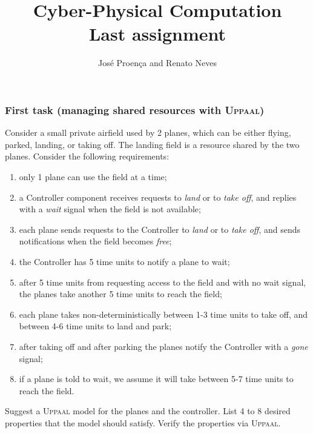\documentclass[11pt]{article}
\date{}
\theoremstyle{myplain}
\theoremstyle{definition} %
\begin{document}
 
 
\title{Cyber-Physical Computation
\\ {\small Last assignment}}
\author{José Proença and Renato Neves}
 
\maketitle

\subsubsection*{First task (managing shared resources with \textsc{Uppaal})}
Consider a small private airfield used by 2 planes, which can be either flying,
parked, landing, or taking off. The landing field is a resource shared by the
two planes. Consider the following requirements:
\begin{enumerate}
  \setlength\itemsep{0.3mm}
  \item only 1 plane can use the field at a time;
  \item a Controller component receives requests to \emph{land} or to \emph{take off}, and replies with a \emph{wait} signal when the field is not available;
  \item each plane sends requests to the Controller to \emph{land} or to \emph{take off}, and sends notifications when the field becomes \emph{free};
  \item the Controller has 5 time units to notify a plane to wait;
  \item after 5 time units from requesting access to the field and with no wait signal, the planes take another 5 time units to reach the field;
  \item each plane takes non-deterministically between 1-3 time units to take off, and between 4-6 time units to land and park;
  \item after taking off and after parking the planes notify the Controller with a \emph{gone} signal;
  \item if a plane is told to wait, we assume it will take between 5-7 time units to reach the field.
\end{enumerate}

\noindent
Suggest a \textsc{Uppaal} model for the planes and the controller. List 4 to 8
desired properties that the model should satisfy. Verify the properties via
\textsc{Uppaal}.
\end{document}
